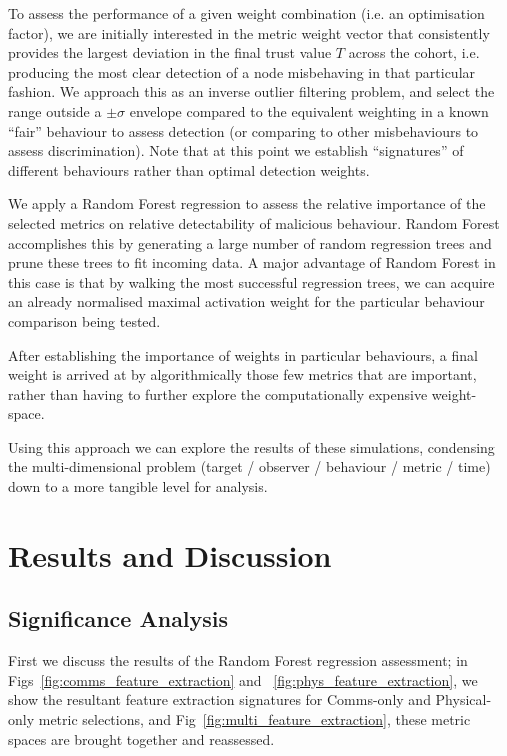 To assess the performance of a given weight combination (i.e. an optimisation factor), we are initially interested in the metric weight vector that consistently provides the largest deviation in the final trust value $T$ across the cohort, i.e. producing the most clear detection of a node misbehaving in that particular fashion.
We approach this as an inverse outlier filtering problem, and select the range outside a $\pm\sigma$ envelope compared to the equivalent weighting in a known ``fair'' behaviour to assess detection (or comparing to other misbehaviours to assess discrimination). Note that at this point we establish ``signatures'' of different behaviours rather than optimal detection weights.

We apply a Random Forest regression \cite{Breiman2001} to assess the relative importance of the selected metrics on relative detectability of malicious behaviour. 
Random Forest accomplishes this by generating a large number of random regression trees and prune these trees to fit incoming data. A major advantage of Random Forest in this case is that by walking the most successful regression trees, we can acquire an already normalised maximal activation weight for the particular behaviour comparison being tested.

After establishing the importance of weights in particular behaviours, a final weight is arrived at by algorithmically those few metrics that are important, rather than having to further explore the computationally expensive weight-space.

Using this approach we can explore the results of these simulations, condensing the multi-dimensional problem (target / observer / behaviour / metric / time) down to a more tangible level for analysis.

\section{Results and Discussion}

\subsection{Significance Analysis}

First we discuss the results of the Random Forest regression assessment; in Figs~\ref{fig:comms_feature_extraction} and ~\ref{fig:phys_feature_extraction}, we show the resultant feature extraction signatures for Comms-only and Physical-only metric selections, and Fig~\ref{fig:multi_feature_extraction}, these metric spaces are brought together and reassessed.

